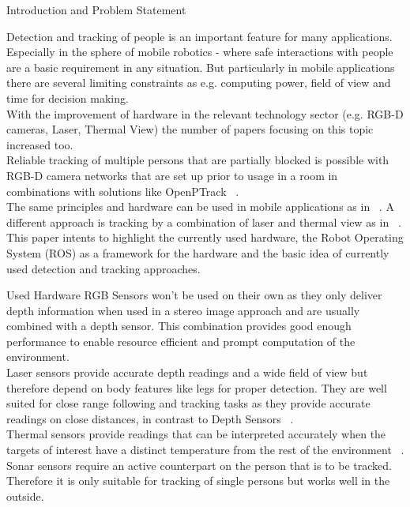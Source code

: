 \documentclass[a4paper,oneside,10pt,DIV12,headsepline,footexclude,headexclude]{scrartcl}
\begin{document}
\begin{section}{Introduction and Problem Statement}

Detection and tracking of people is an important feature for many applications.
Especially in the sphere of mobile robotics - where safe interactions with
people are a basic requirement in any situation. But particularly in mobile
applications there are several limiting constraints as e.g. computing power,
field of view and time for decision making.\\
With the improvement of hardware in the relevant technology sector (e.g. RGB-D cameras, 
Laser, Thermal View) the number of papers focusing on this topic increased too.\\
Reliable tracking of multiple persons that are partially blocked is 
possible with RGB-D camera networks that are set up prior to usage in a room in
combinations with solutions like OpenPTrack ~\cite{munaro2014openptrack}.\\
The same principles and hardware can be used in mobile applications as in 
~\cite{munaro2012tracking}. A different approach is tracking by a combination of 
laser and thermal view  as in ~\cite{7139259}.\\

This paper intents to highlight the currently used hardware, the Robot Operating
System (ROS) as a framework for the hardware and the basic idea of currently
used detection and tracking approaches. 
\newpage

\begin{subsection}{Used Hardware}
RGB Sensors won't be used on their own as they only deliver depth information
when used in a stereo image approach and are usually combined with a depth sensor. 
This combination provides good enough performance to enable resource efficient 
and prompt computation of the environment.\\
Laser sensors provide accurate depth readings and a wide field of view but therefore
depend on body features like legs for proper detection. They are well suited for
close range following and tracking tasks as they provide accurate readings on close
distances, in contrast to Depth Sensors ~\cite{7139259}.\\
Thermal sensors provide readings that can be interpreted accurately when the 
targets of interest have a distinct temperature from the rest of the environment ~\cite{ciric2013computationally}.\\
Sonar sensors require an active counterpart on the person that is to be tracked. 
Therefore it is only suitable for tracking of single persons but works well
in the outside.\\



\end{subsection}
\end{section}
\end{document}
